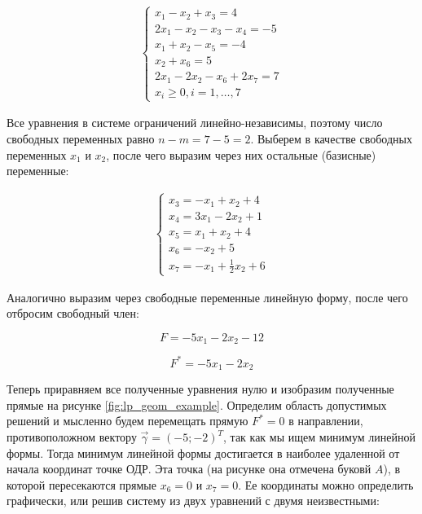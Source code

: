 \documentclass[a4paper,12pt]{report}
\begin{document}
\begin{align*}
\begin{cases}
x_{1} - x_{2} + x_{3} = 4\\
2x_{1} - x_{2} - x_{3} - x_{4} = -5\\
x_{1} + x_{2} - x_{5} = -4\\
x_{2} + x_{6} = 5\\
2x_{1} - 2x_{2} - x_{6} + 2x_{7} = 7\\
x_{i} \geq 0, i=1,\ldots,7
\end{cases}	
\end{align*}

Все уравнения в системе ограничений линейно-независимы, поэтому число свободных переменных равно $n - m = 7 - 5 = 2$. Выберем в качестве свободных переменных $x_{1}$ и $x_{2}$, после чего выразим через них остальные (базисные) переменные:

\begin{align*}
\begin{cases}
x_{3} = -x_{1} + x_{2} + 4\\
x_{4} = 3x_{1} - 2x_{2} + 1\\
x_{5} = x_{1} + x_{2} + 4\\
x_{6} = -x_{2} + 5\\
x_{7} = -x_{1} + \frac{1}{2}x_{2} + 6
\end{cases}	
\end{align*}

Аналогично выразим через свободные переменные линейную форму, после чего отбросим свободный член:

\begin{equation*}
F = -5x_{1} - 2x_{2} - 12
\end{equation*}

\begin{equation*}
F^{*} = -5x_{1} - 2x_{2}
\end{equation*}

Теперь приравняем все полученные уравнения нулю и изобразим полученные прямые на рисунке \ref{fig:lp_geom_example}. Определим область допустимых решений и мысленно будем перемещать прямую $F^{*} = 0$ в направлении, противоположном вектору $\vec{\gamma} = (-5; -2)^{T}$, так как мы ищем минимум линейной формы. Тогда минимум линейной формы достигается в наиболее удаленной от начала координат точке ОДР. Эта точка (на рисунке она отмечена буковй $A$), в которой пересекаются прямые $x_{6} = 0$ и $x_{7} = 0$. Ее координаты можно определить графически, или решив систему из двух уравнений с двумя неизвестными:
\end{document}
